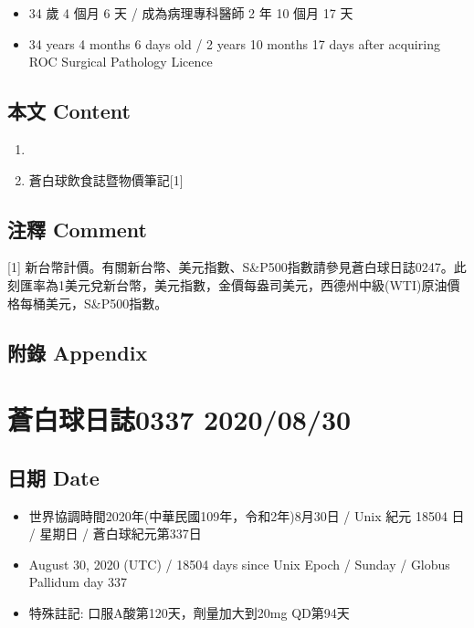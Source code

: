 \documentclass[a5paper, 11pt
]{book}
\providecommand{\tightlist}{%
  \setlength{\itemsep}{0pt}\setlength{\parskip}{0pt}}
\begin{document}
\begin{itemize}
\tightlist
\item
  34 歲 4 個月 6 天 / 成為病理專科醫師 2 年 10 個月 17 天
\item
  34 years 4 months 6 days old / 2 years 10 months 17 days after
  acquiring ROC Surgical Pathology Licence
\end{itemize}

\hypertarget{ux672cux6587-content-89}{%
\subsection{本文 Content}\label{ux672cux6587-content-89}}

\begin{enumerate}
\def\labelenumi{\arabic{enumi}.}
\tightlist
\item
\item
  蒼白球飲食誌暨物價筆記{[}1{]}
\end{enumerate}

\hypertarget{ux6ce8ux91cb-comment-89}{%
\subsection{注釋 Comment}\label{ux6ce8ux91cb-comment-89}}

{[}1{]}
新台幣計價。有關新台幣、美元指數、S\&P500指數請參見蒼白球日誌0247。此刻匯率為1美元兌新台幣，美元指數，金價每盎司美元，西德州中級(WTI)原油價格每桶美元，S\&P500指數。

\hypertarget{ux9644ux9304-appendix-89}{%
\subsection{附錄 Appendix}\label{ux9644ux9304-appendix-89}}

\hypertarget{ux84bcux767dux7403ux65e5ux8a8c0337-20200830}{%
\section{蒼白球日誌0337
2020/08/30}\label{ux84bcux767dux7403ux65e5ux8a8c0337-20200830}}

\hypertarget{ux65e5ux671f-date-90}{%
\subsection{日期 Date}\label{ux65e5ux671f-date-90}}

\begin{itemize}
\tightlist
\item
  世界協調時間2020年(中華民國109年，令和2年)8月30日 / Unix 紀元 18504 日
  / 星期日 / 蒼白球紀元第337日
\item
  August 30, 2020 (UTC) / 18504 days since Unix Epoch / Sunday / Globus
  Pallidum day 337
\item
  特殊註記: 口服A酸第120天，劑量加大到20mg QD第94天
\end{itemize}
\end{document}
